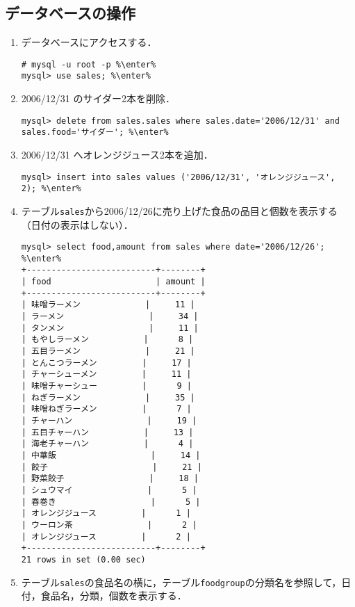 \documentclass{jlreq}
\begin{document}
\subsection{データベースの操作}
\begin{enumerate}
    \item データベースにアクセスする．
          \begin{lstlisting}
# mysql -u root -p %\enter%
mysql> use sales; %\enter%
    \end{lstlisting}
    \item 2006/12/31 のサイダー2本を削除．
          \begin{lstlisting}
mysql> delete from sales.sales where sales.date='2006/12/31' and sales.food='サイダー'; %\enter%
\end{lstlisting}
    \item 2006/12/31 へオレンジジュース2本を追加．
          \begin{lstlisting}
mysql> insert into sales values ('2006/12/31', 'オレンジジュース', 2); %\enter%
\end{lstlisting}
    \item テーブル\texttt{sales}から2006/12/26に売り上げた食品の品目と個数を表示する（日付の表示はしない）．
          \begin{lstlisting}
mysql> select food,amount from sales where date='2006/12/26'; %\enter%
+--------------------------+--------+
| food                     | amount |
+--------------------------+--------+
| 味噌ラーメン             |     11 |
| ラーメン                 |     34 |
| タンメン                 |     11 |
| もやしラーメン           |      8 |
| 五目ラーメン             |     21 |
| とんこつラーメン         |     17 |
| チャーシューメン         |     11 |
| 味噌チャーシュー         |      9 |
| ねぎラーメン             |     35 |
| 味噌ねぎラーメン         |      7 |
| チャーハン               |     19 |
| 五目チャーハン           |     13 |
| 海老チャーハン           |      4 |
| 中華飯                   |     14 |
| 餃子                     |     21 |
| 野菜餃子                 |     18 |
| シュウマイ               |      5 |
| 春巻き                   |      5 |
| オレンジジュース         |      1 |
| ウーロン茶               |      2 |
| オレンジジュース         |      2 |
+--------------------------+--------+
21 rows in set (0.00 sec)
\end{lstlisting}
    \item テーブル\texttt{sales}の食品名の横に，テーブル\texttt{foodgroup}の分類名を参照して，日付，食品名，分類，個数を表示する．

\end{enumerate}
\end{document}
